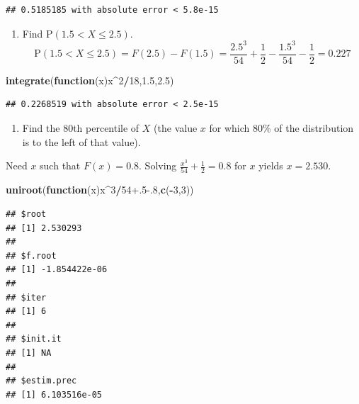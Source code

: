 \documentclass[
]{book}
\newenvironment{Shaded}{\begin{snugshade}}{\end{snugshade}}
\newcommand{\ControlFlowTok}[1]{\textcolor[rgb]{0.13,0.29,0.53}{\textbf{#1}}}
\newcommand{\DecValTok}[1]{\textcolor[rgb]{0.00,0.00,0.81}{#1}}
\newcommand{\FloatTok}[1]{\textcolor[rgb]{0.00,0.00,0.81}{#1}}
\newcommand{\KeywordTok}[1]{\textcolor[rgb]{0.13,0.29,0.53}{\textbf{#1}}}
\newcommand{\NormalTok}[1]{#1}
\newcommand{\OperatorTok}[1]{\textcolor[rgb]{0.81,0.36,0.00}{\textbf{#1}}}
\providecommand{\tightlist}{%
  \setlength{\itemsep}{0pt}\setlength{\parskip}{0pt}}
\begin{document}
\begin{verbatim}
## 0.5185185 with absolute error < 5.8e-15
\end{verbatim}

\begin{enumerate}
\def\labelenumi{\alph{enumi}.}
\setcounter{enumi}{4}
\tightlist
\item
  Find \(\mbox{P}(1.5<X\leq 2.5)\).
  \[
  \mbox{P}(1.5< X \leq 2.5)=F(2.5)-F(1.5)=\frac{2.5^3}{54}+\frac{1}{2}-\frac{1.5^3}{54}-\frac{1}{2}=0.227
  \]
\end{enumerate}

\begin{Shaded}
\begin{Highlighting}[]
\KeywordTok{integrate}\NormalTok{(}\ControlFlowTok{function}\NormalTok{(x)x}\OperatorTok{^}\DecValTok{2}\OperatorTok{/}\DecValTok{18}\NormalTok{,}\FloatTok{1.5}\NormalTok{,}\FloatTok{2.5}\NormalTok{)}
\end{Highlighting}
\end{Shaded}

\begin{verbatim}
## 0.2268519 with absolute error < 2.5e-15
\end{verbatim}

\begin{enumerate}
\def\labelenumi{\alph{enumi}.}
\setcounter{enumi}{5}
\tightlist
\item
  Find the 80th percentile of \(X\) (the value \(x\) for which 80\% of the distribution is to the left of that value).
\end{enumerate}

Need \(x\) such that \(F(x)=0.8\). Solving \(\frac{x^3}{54}+\frac{1}{2}=0.8\) for \(x\) yields \(x=2.530\).

\begin{Shaded}
\begin{Highlighting}[]
\KeywordTok{uniroot}\NormalTok{(}\ControlFlowTok{function}\NormalTok{(x)x}\OperatorTok{^}\DecValTok{3}\OperatorTok{/}\DecValTok{54}\FloatTok{+.5-.8}\NormalTok{,}\KeywordTok{c}\NormalTok{(}\OperatorTok{-}\DecValTok{3}\NormalTok{,}\DecValTok{3}\NormalTok{))}
\end{Highlighting}
\end{Shaded}

\begin{verbatim}
## $root
## [1] 2.530293
## 
## $f.root
## [1] -1.854422e-06
## 
## $iter
## [1] 6
## 
## $init.it
## [1] NA
## 
## $estim.prec
## [1] 6.103516e-05
\end{verbatim}
\end{document}

